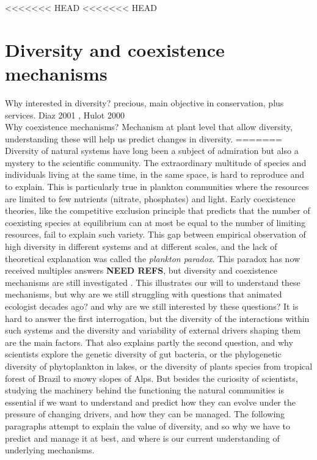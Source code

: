 <<<<<<< HEAD
<<<<<<< HEAD
\section{Diversity and coexistence mechanisms}
Why interested in diversity? precious, main objective in conservation, plus services. Diaz 2001 , Hulot 2000\\
 Why coexistence mechanisms? Mechanism at plant level that allow diversity, understanding these will help us predict changes in diversity.
=======
Diversity of natural systems have long been a subject of admiration but also a mystery to the scientific community. The extraordinary multitude of species and individuals living at the same time, in the same space, is hard to reproduce and to explain. This is particularly true in plankton communities where the resources are limited to few nutrients (nitrate, phosphates) and light. Early coexistence theories, like the competitive exclusion principle that predicts that the number of coexisting species at equilibrium can at most be equal to the number of limiting resources, fail to explain such variety. This gap between empirical observation of high diversity in different systems and at different scales, and the lack of theoretical explanation was called the \textit{plankton paradox}. This paradox has now received multiples answers \textbf{NEED REFS}, but diversity and coexistence mechanisms are still investigated \cite{falster_plant:_2016}. This illustrates our will to understand these mechanisms, but why are we still struggling with questions that animated ecologist decades ago? and why are we still interested by these questions? It is hard to answer the first interrogation, but the diversity of the interactions within such systems and the diversity and variability of external drivers shaping them are the main factors. That also explains partly the second question, and why scientists explore the genetic diversity of gut bacteria, or the phylogenetic diversity of phytoplankton in lakes, or the diversity of plants species from tropical forest of Brazil to snowy slopes of Alps. But besides the curiosity of scientists, studying the machinery behind the functioning the natural communities is essential if we want to understand and predict how they can evolve under the pressure of changing drivers, and how they can be managed. The following paragraphs attempt to explain the value of diversity, and so why we have to predict and manage it at best, and where is our current understanding of underlying mechanisms.\\

